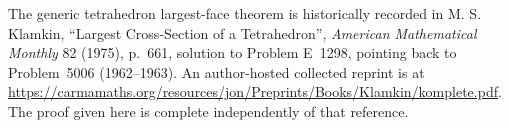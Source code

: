 The generic tetrahedron largest-face theorem is historically recorded
in M. S. Klamkin, ``Largest Cross-Section of a Tetrahedron'',
\emph{American Mathematical Monthly} 82 (1975), p.~661, solution to
Problem E~1298, pointing back to Problem~5006 (1962--1963).
An author-hosted collected reprint is at
\url{https://carmamaths.org/resources/jon/Preprints/Books/Klamkin/komplete.pdf}.
The proof given here is complete independently of that reference.
